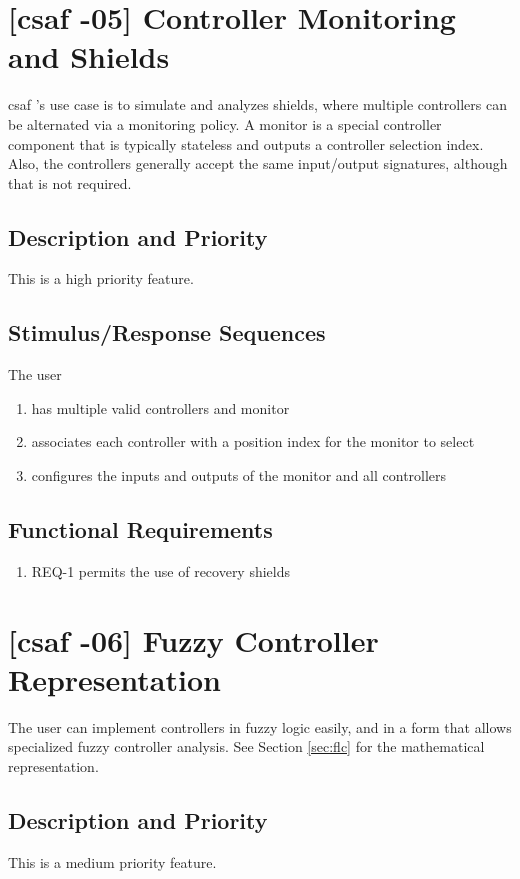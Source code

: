\section{[\acrshort{csaf} -05] Controller Monitoring and Shields}

\acrshort{csaf} 's use case is to simulate and analyzes shields, where multiple controllers can be alternated 
via a monitoring policy. A monitor is a special controller component that is typically stateless and outputs a 
controller selection index. Also, the controllers generally accept the same input/output signatures, although 
that is not required. 

\subsection{Description and Priority}
This is a high priority feature.

\subsection{Stimulus/Response Sequences}
The user
\begin{enumerate}
\item has multiple valid controllers and monitor
\item associates each controller with a position index for the monitor to select 
\item  configures the inputs and outputs of the monitor and all controllers
\end{enumerate}

\subsection{Functional Requirements}
\begin{enumerate}
\item REQ-1 \quad permits the use of recovery shields
\end{enumerate}

\section{[\acrshort{csaf} -06] Fuzzy Controller Representation}

The user can implement controllers in fuzzy logic easily, and in a form that allows specialized fuzzy controller analysis. See Section \ref{sec:flc} for the mathematical representation.

\subsection{Description and Priority}
This is a medium priority feature.

